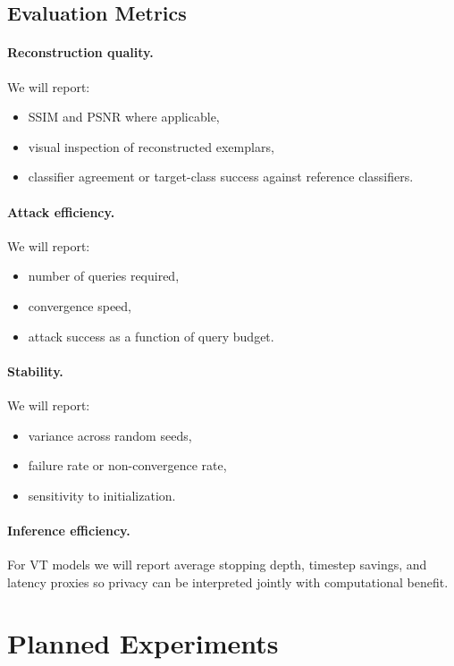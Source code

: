 \documentclass[11pt]{article}
\begin{document}
\subsection{Evaluation Metrics}
\paragraph{Reconstruction quality.}
We will report:
\begin{itemize}[leftmargin=1.3em]
\item SSIM and PSNR where applicable,
\item visual inspection of reconstructed exemplars,
\item classifier agreement or target-class success against reference classifiers.
\end{itemize}

\paragraph{Attack efficiency.}
We will report:
\begin{itemize}[leftmargin=1.3em]
\item number of queries required,
\item convergence speed,
\item attack success as a function of query budget.
\end{itemize}

\paragraph{Stability.}
We will report:
\begin{itemize}[leftmargin=1.3em]
\item variance across random seeds,
\item failure rate or non-convergence rate,
\item sensitivity to initialization.
\end{itemize}

\paragraph{Inference efficiency.}
For VT models we will report average stopping depth, timestep savings, and latency proxies so privacy can be interpreted jointly with computational benefit.

\section{Planned Experiments}
\end{document}

